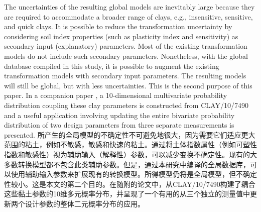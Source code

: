 \begin{Parallel}{0.60\textwidth}{}
{    }
    \ParallelPar
    
    \ParallelLText
    {
        The uncertainties of the resulting global models are inevitably large because they are required to accommodate a broader range of clays, e.g., insensitive, sensitive, and quick clays. It is possible to reduce the transformation uncertainty by considering soil index properties (such as plasticity index and sensitivity) as secondary input (explanatory) parameters. Most of the existing transformation models do not include such secondary parameters. Nonetheless, with the global database compiled in this study, it is possible to augment the existing transformation models with secondary input parameters. The resulting models will still be global, but with less uncertainties. This is the second purpose of this paper. In a companion paper \citep{Ching2014686}, a 10-dimensional multivariate probability distribution coupling these clay parameters is constructed from CLAY/10/7490 and a useful application involving updating the entire bivariate probability distribution of two design parameters from three separate measurements is presented.
    }
    \ParallelRText
    {
        所产生的全局模型的不确定性不可避免地很大，因为需要它们适应更大范围的粘土，例如不敏感，敏感和快速的粘土。通过将土体指数属性（例如可塑性指数和敏感性）视为辅助输入（解释性）参数，可以减少变换不确定性。现有的大多数转换模型都不包含此类辅助参数。但是，通过本研究中编译的全局数据库，可以使用辅助输入参数来扩展现有的转换模型。所得模型仍将是全局模型，但不确定性较小。这是本文的第二个目的。在随附的论文中\citep{Ching2014686}，从CLAY/10/7490构建了耦合这些黏土参数的10维多元概率分布，并呈现了一个有用的从三个独立的测量值中更新两个设计参数的整体二元概率分布的应用。
    }
\end{Parallel}